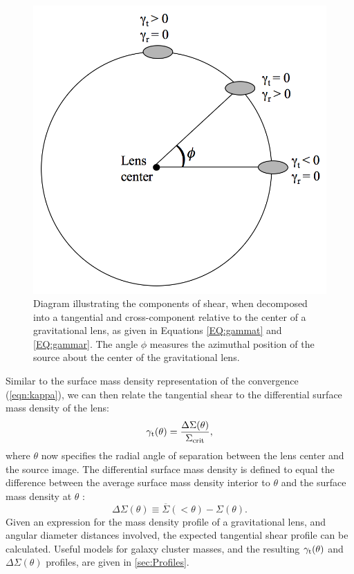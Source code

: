 \begin{figure}
\begin{center}
\includegraphics[scale=0.4]{plots_intro/TangentialShear.png}
\caption[Tangential Shear]{Diagram illustrating the components of shear, when decomposed into a tangential and cross-component relative to the center of a gravitational lens, as given in Equations \ref{EQ:gammat} and \ref{EQ:gammar}. The angle $\phi$ measures the azimuthal position of the source about the center of the gravitational lens.}
\label{plot:shearcomponents}
\end{center}
\end{figure}

Similar to the surface mass density representation of the convergence (\autoref{eqn:kappa}), we can then relate the tangential shear to the differential surface mass density of the lens:
\begin{equation}
\gamma_{\rm t}(\theta) = \frac{\Delta\Sigma(\theta)}{\Sigma_{\rm crit}},
\end{equation}
where $\theta$ now specifies the radial angle of separation between the lens center and the source image. The differential surface mass density is defined to equal the difference between the average surface mass density interior to $\theta$ and the surface mass density at $\theta$ \citep{Wright00}: 
\begin{equation}
\label{eqn:deltasigma}
\Delta\Sigma(\theta) \equiv \overline{\Sigma}(< \theta) - \Sigma(\theta).
\end{equation}
Given an expression for the mass density profile of a gravitational lens, and angular diameter distances involved, the expected tangential shear profile can be calculated. Useful models for galaxy cluster masses, and the resulting $\gamma_{\rm t}(\theta)$ and $\Delta\Sigma(\theta)$ profiles, are given in \autoref{sec:Profiles}.

